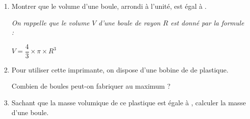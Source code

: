 \begin{enumerate}
	\item Montrer que le volume d'une boule, arrondi à l'unité, est égal à .

	\emph{On rappelle que le volume $V$ d'une boule de rayon $R$ est donné par la formule :}

	$V=\dfrac{4}{3} \times \pi \times R^{3}$

	\item Pour utiliser cette imprimante, on dispose d'une bobine de  de plastique.

	Combien de boules peut-on fabriquer au maximum ?

	\item Sachant que la masse volumique de ce plastique est égale à , calculer la masse d'une boule.
\end{enumerate}

